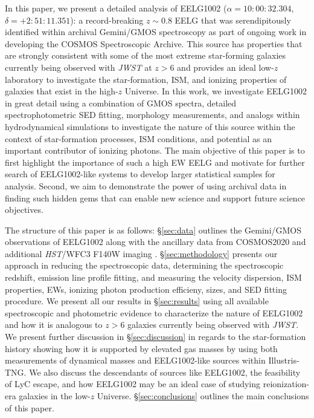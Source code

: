 \documentclass[twocolumn,tight,times,linenumbers]{aastex631}
\begin{document}
            In this paper, we present a detailed analysis of EELG1002 ($\alpha = 10:00:32.304$, $\delta = +2:51:11.351$): a record-breaking $z \sim 0.8$ EELG that was serendipitously identified within archival Gemini/GMOS spectroscopy as part of ongoing work in developing the COSMOS Spectroscopic Archive. This source has properties that are strongly consistent with some of the most extreme star-forming galaxies currently being observed with \textit{JWST} at $z > 6$ and provides an ideal low-$z$ laboratory to investigate the star-formation, ISM, and ionizing properties of galaxies that exist in the high-$z$ Universe. In this work, we investigate EELG1002 in great detail using a combination of GMOS spectra, detailed spectrophotometric SED fitting, morphology measurements, and analogs within hydrodynamical simulations to investigate the nature of this source within the context of star-formation processes, ISM conditions, and potential as an important contributor of ionizing photons. The main objective of this paper is to first highlight the importance of such a high EW EELG and motivate for further search of EELG1002-like systems to develop larger statistical samples for analysis. Second, we aim to demonstrate the power of using archival data in finding such hidden gems that can enable new science and support future science objectives. 
            
            The structure of this paper is as follows: \S\ref{sec:data} outlines the Gemini/GMOS observations of EELG1002 along with the ancillary data from COSMOS2020 \citep{Weaver2022} and additional \textit{HST}/WFC3 F140W imaging \citep{Silverman2018,Ding2020}. \S\ref{sec:methodology} presents our approach in reducing the spectroscopic data, determining the spectroscopic redshift, emission line profile fitting, and measuring the velocity dispersion, ISM properties, EWs, ionizing photon production efficieny, sizes, and SED fitting procedure. We present all our results in \S\ref{sec:results} using all available spectroscopic and photometric evidence to characterize the nature of EELG1002 and how it is analogous to $z > 6$ galaxies currently being observed with \textit{JWST}. We present further discussion in \S\ref{sec:discussion} in regards to the star-formation history showing how it is supported by elevated gas masses by using both measurements of dynamical masses and EELG1002-like sources within Illustris-TNG. We also discuss the descendants of sources like EELG1002, the feasibility of LyC escape, and how EELG1002 may be an ideal case of studying reionization-era galaxies in the low-$z$ Universe. \S\ref{sec:conclusions} outlines the main conclusions of this paper.
            
\end{document}
